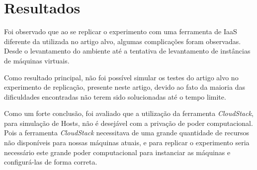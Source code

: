 \section{Resultados}

Foi observado que ao se replicar o experimento com uma ferramenta de IaaS diferente da utilizada no artigo alvo, algumas complicações foram observadas. Desde o levantamento do ambiente até a tentativa de levantamento de instâncias de máquinas virtuais.

Como resultado principal, não foi possível simular os testes do artigo alvo no experimento de replicação, presente neste artigo, devido ao fato da maioria das dificuldades encontradas não terem sido solucionadas até o tempo limite.

Como um forte conclusão, foi avaliado que a utilização da ferramenta \textit{CloudStack}, para simulação de Hosts, não é desejável com a privação de poder computacional. Pois a ferramenta \textit{CloudStack} necessitava de uma grande quantidade de recursos não disponíveis para nossas máquinas atuais, e para replicar o experimento seria necessário este grande poder computacional para instanciar as máquinas e configurá-las de forma correta.
